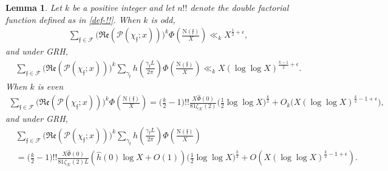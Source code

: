 \documentclass[11pt]{amsart}
\newcommand{\norm}{\mathrm{N}}
\newtheorem{lemma}[prop]{Lemma}
\numberwithin{equation}{section}
\renewcommand{\Re}{{\mathfrak{Re}}}
\theoremstyle{remark}
\begin{document}
\begin{lemma}\label{moments} 
    Let $k$ be a positive integer and let $n!!$ denote the double factorial function defined as in \eqref{def-!!}. When $k$ is odd,
    \begin{align*}
        \sum_{\mathfrak{f}\in\mathcal{F}}\big(\Re(\mathcal{P}(\chi_\mathfrak{f}; x))\big)^{k}\Phi\left(\frac{\norm(\mathfrak{f})}{X}\right)
        \ll_k
        X^{\frac{1}{2}+\epsilon},
    \end{align*}
    and under GRH,
    \begin{align*}
        \sum_{\mathfrak{f}\in\mathcal{F}}\big(\Re(\mathcal{P}(\chi_\mathfrak{f}; x))\big)^{k}\sum_{\gamma_{\mathfrak{f}}} h\left( \frac{\gamma_{\mathfrak{f}} L}{2\pi}\right)\Phi\left(\frac{\norm(\mathfrak{f})}{X}\right)
        \ll_k
         X(\log \log X)^{\frac{k-1}{2}+\epsilon}.
    \end{align*}
    When $k$ is even
    \begin{align*}
        \sum_{\mathfrak{f}\in\mathcal{F}}\big(\Re(\mathcal{P}(\chi_\mathfrak{f}; x))\big)^{k}\Phi\left(\frac{\norm(\mathfrak{f})}{X}\right)
        =
        \Big(\frac{k}{2}-1\Big)!! \frac{X\widehat{\Phi}(0)}{81\zeta_\mathcal{K}(2)} \Big(\frac{1}{2}\log\log X\Big)^{\frac{k}{2}}+O_{k}\big(X(\log\log X)^{\frac{k}{2}-1+\epsilon}\big),
    \end{align*}
    and under GRH,
    \begin{align*}
        &\sum_{\mathfrak{f}\in\mathcal{F}}\big(\Re(\mathcal{P}(\chi_\mathfrak{f}; x))\big)^{k}\sum_{\gamma_{\mathfrak{f}}} h\left( \frac{\gamma_{\mathfrak{f}} L}{2\pi}\right)\Phi\left(\frac{\norm(\mathfrak{f})}{X}\right)\\
    &=
    \Big(\frac{k}{2}-1\Big)!!\frac{X\widehat{\Phi}(0)}{81\zeta_\mathcal{K}(2)L}     
    \left(\hat{h}(0) \log X + O(1)\right) \Big(\frac{1}{2}\log \log X\Big)^{\frac{k}{2}}
    +
    O( X(\log \log X)^{\frac{k}{2}-1+\epsilon} ).
    \end{align*}
\end{lemma}
\end{document}
